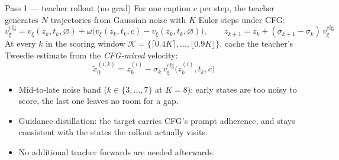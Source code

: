 \documentclass[aspectratio=169,10pt]{beamer}
\newcommand{\xtil}{\tilde{x}_0}
\begin{document}
\begin{frame}{Pass 1 --- teacher rollout (no grad)}
  For one caption $c$ per step, the teacher generates $N$ trajectories from
  Gaussian noise with $K$ Euler steps under CFG:
  \[
    v^{\mathrm{cfg}}_\xi = v_\xi(z_k, t_k, \varnothing)
      + \omega \big( v_\xi(z_k, t_k, c) - v_\xi(z_k, t_k, \varnothing) \big),
    \qquad
    z_{k+1} = z_k + (\sigma_{k+1} - \sigma_k)\, v^{\mathrm{cfg}}_\xi
  \]
  At every $k$ in the scoring window
  $\mathcal{K} = \{ \lceil 0.4K \rceil, \dots, \lfloor 0.9K \rfloor \}$, cache
  the teacher's Tweedie estimate from the \emph{CFG-mixed} velocity:
  \[
    \xtil^{(i,k)} = z^{(i)}_k - \sigma_k\,
      v^{\mathrm{cfg}}_\xi\big(z^{(i)}_k, t_k, c\big)
  \]
  \begin{itemize}
    \item Mid-to-late noise band ($k \in \{3, \dots, 7\}$ at $K{=}8$): early
      states are too noisy to score, the last one leaves no room for a gap.
    \item Guidance distillation: the target carries CFG's prompt adherence,
      and stays consistent with the states the rollout actually visits.
    \item No additional teacher forwards are needed afterwards.
  \end{itemize}
\end{frame}
\end{document}
